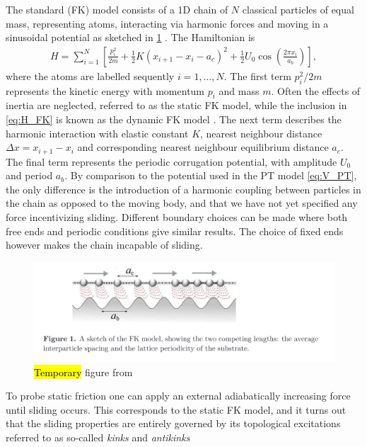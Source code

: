 The standard (\acrshort{FK}) model consists of a 1D chain of $N$ classical particles of equal mass, representing atoms, interacting via harmonic forces and moving in a sinusoidal potential as sketched in \cref{fig:FK_model} \cite{Manini_2016}. The Hamiltonian is 
\begin{align}
  H = \sum_{i=1}^N \left[\frac{p_i^2}{2m} + \frac{1}{2}K(x_{i+1} - x_i - a_c)^2 + \frac{1}{2}U_0 \cos{\left(\frac{2\pi x_i}{a_b}\right)}\right],
  \label{eq:H_FK}
\end{align}
where the atoms are labelled sequently $i = 1, \hdots, N$. The first term $p_i^2/2m$ represents the kinetic energy with momentum $p_i$
and mass $m$. Often the effects of inertia are neglected, referred to as the static \acrshort{FK} model, while the inclusion in \cref{eq:H_FK} is known as the dynamic \acrshort{FK} model \cite{FK2D}. The next term describes the harmonic interaction with elastic
constant $K$, nearest neighbour distance $\Delta x = x_{i+1} - x_i$ and 
corresponding nearest neighbour equilibrium distance $a_c$. The final term represents the periodic corrugation potential, with amplitude $U_0$ and period $a_b$. By comparison to the potential used in the \acrshort{PT} model \cref{eq:V_PT}, the only difference is the introduction of a harmonic coupling between particles in the chain as opposed to the moving body, and that we have not yet specified any force incentivizing sliding. Different boundary choices can be made where both free ends and periodic conditions give similar results. The choice of fixed ends however makes the chain incapable of sliding.

\begin{figure}[H]
  \centering
  \includegraphics[width=0.8\linewidth]{figures/theory/FK_model.png}
  \caption{\hl{Temporary} figure from \cite{Manini_2016}}
  \label{fig:FK_model}
\end{figure}

To probe static friction one can apply an external adiabatically increasing force until sliding occurs. This corresponds to the static \acrshort{FK} model, and it turns out that the sliding properties are entirely governed by its topological excitations referred to as so-called \textit{kinks} and \textit{antikinks}

